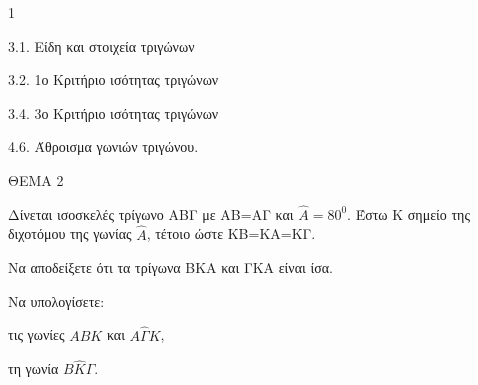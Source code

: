 \begin{ylh}{1}
    \item 3.1. Είδη και στοιχεία τριγώνων
    \item 3.2. 1ο Κριτήριο ισότητας τριγώνων
    \item 3.4. 3ο Κριτήριο ισότητας τριγώνων
    \item 4.6. Άθροισμα γωνιών τριγώνου.
\end{ylh}

ΘΕΜΑ 2

Δίνεται ισοσκελές τρίγωνο ΑΒΓ με ΑΒ=ΑΓ και $\widehat{Α} = 80^{0}$. Έστω Κ σημείο της διχοτόμου της γωνίας $\widehat{Α}$, τέτοιο ώστε ΚΒ=ΚΑ=ΚΓ.

\begin{alist}
\item Να αποδείξετε ότι τα τρίγωνα ΒΚΑ και ΓΚΑ είναι ίσα. 

\item Να υπολογίσετε:
\begin{rlist}
\item τις γωνίες $A\widehat{B}K$ και $A\widehat{\Gamma}K$, 
\item τη γωνία $B\widehat{K}\Gamma$. 
\end{rlist}

\begin{center}
\end{center}
\end{alist}
